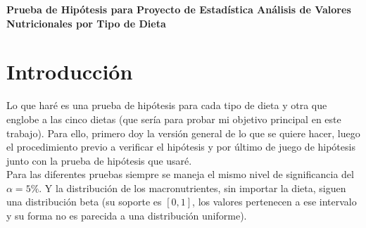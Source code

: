 \documentclass[12pt,a4paper]{article}
\begin{document}
    
    \begin{center}
        {\Large
            \textbf{ Prueba de Hipótesis para Proyecto de Estadística Análisis de Valores Nutricionales por Tipo de Dieta}
        }
    \end{center}

    \section{Introducción}
    {
        Lo que haré es una prueba de hipótesis para cada tipo de dieta y otra 
        que englobe a las cinco dietas (que sería para probar mi objetivo principal 
        en este trabajo). Para ello, primero doy la versión general de lo que se quiere 
        hacer, luego el procedimiento previo a verificar el hipótesis y por último de 
        juego de hipótesis junto con la prueba de hipótesis que usaré. \\

        Para las diferentes pruebas siempre se maneja el mismo nivel de significancia 
        del $\alpha = 5\%$. Y la distribución de los macronutrientes, sin importar la 
        dieta, siguen una distribución beta (su soporte es $[0,1]$, los valores pertenecen 
        a ese intervalo y su forma no es parecida a una distribución uniforme).
    }

    \newpage
\end{document}
